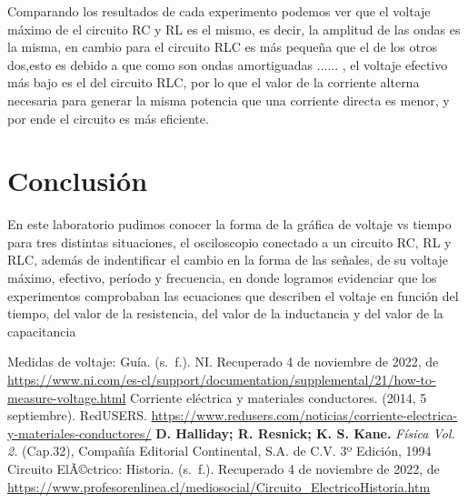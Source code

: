 \documentclass[]{article}
\begin{document}
Comparando los resultados de cada experimento podemos ver que el voltaje máximo de el circuito RC y RL es el mismo, es decir, la amplitud de las ondas es la misma, en cambio para el circuito RLC  es más pequeña que el de los otros dos,esto es debido a que como son ondas amortiguadas ...... , el voltaje efectivo más bajo es el del circuito RLC, por lo que el valor de la corriente alterna necesaria para generar la misma potencia que una corriente directa es menor, y por ende el circuito es más eficiente.\\





\section{Conclusión}
En este laboratorio pudimos conocer la forma de la gráfica de voltaje vs tiempo para tres distintas situaciones, el osciloscopio conectado a un circuito RC, RL y RLC, además de indentificar el cambio en la forma de las señales, 
de su voltaje máximo, efectivo, período y frecuencia, en donde logramos evidenciar que los experimentos comprobaban las ecuaciones que describen el voltaje en función del tiempo, del valor de la resistencia, del valor de la inductancia y del valor de la capacitancia  



\begin{thebibliography}{5}
   Medidas de voltaje: Guía. (s. f.). NI. Recuperado 4 de noviembre de 2022, 
  de \url{https://www.ni.com/es-cl/support/documentation/supplemental/21/how-to-measure-voltage.html}
  Corriente eléctrica y materiales conductores. (2014, 5 septiembre). RedUSERS. 
  \url{https://www.redusers.com/noticias/corriente-electrica-y-materiales-conductores/}
   \textbf{D. Halliday; R. Resnick; K. S. Kane.} \textit{Física Vol. 2.} (Cap.32), Compañía Editorial Continental, S.A. de C.V. 3º Edición, 1994
   Circuito ElÃ©ctrico: Historia. (s. f.). Recuperado 4 de noviembre de 2022,
   de \url{https://www.profesorenlinea.cl/mediosocial/Circuito_ElectricoHistoria.htm}
\end{thebibliography}
\end{document}
